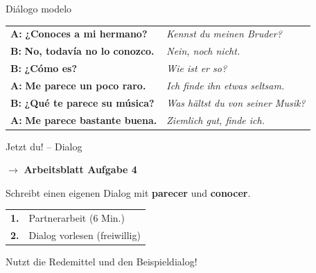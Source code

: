 \documentclass[aspectratio=169, 11pt]{beamer}
\newcommand{\seriftext}[1]{{\fontfamily{ppl}\selectfont #1}}
\newcommand{\es}[1]{\seriftext{\textbf{#1}}}
\newcommand{\de}[1]{\textit{\textcolor{mittelgrau}{#1}}}
\newcommand{\abmark}[1]{{\Large$\rightarrow$ \textbf{Arbeitsblatt Aufgabe #1}}}
\begin{document}
\begin{frame}{Diálogo modelo}
    \vspace{0.3cm}

    \begin{center}
        \begin{tabular}{@{}p{7cm}p{5.5cm}@{}}
            \textbf{A:} \es{¿Conoces a mi hermano?} & \de{Kennst du meinen Bruder?} \\[0.5em]
            \textbf{B:} \es{No, todavía no lo conozco.} & \de{Nein, noch nicht.} \\[0.5em]
            \textbf{B:} \es{¿Cómo es?} & \de{Wie ist er so?} \\[0.5em]
            \textbf{A:} \es{Me parece un poco raro.} & \de{Ich finde ihn etwas seltsam.} \\[0.5em]
            \textbf{B:} \es{¿Qué te parece su música?} & \de{Was hältst du von seiner Musik?} \\[0.5em]
            \textbf{A:} \es{Me parece bastante buena.} & \de{Ziemlich gut, finde ich.} \\
        \end{tabular}
    \end{center}
\end{frame}

\begin{frame}{Jetzt du! -- Dialog}
    \vspace{0.8cm}

    \begin{center}
        \abmark{4}

        \vspace{0.8cm}

        {\large Schreibt einen eigenen Dialog mit \es{parecer} und \es{conocer}.}

        \vspace{0.6cm}

        \begin{tabular}{cl}
            \textcolor{akzent}{\textbf{1.}} & Partnerarbeit (6 Min.) \\[0.3em]
            \textcolor{akzent}{\textbf{2.}} & Dialog vorlesen (freiwillig) \\
        \end{tabular}

        \vspace{0.8cm}

        {\small Nutzt die Redemittel und den Beispieldialog!}
    \end{center}
\end{frame}
\end{document}
